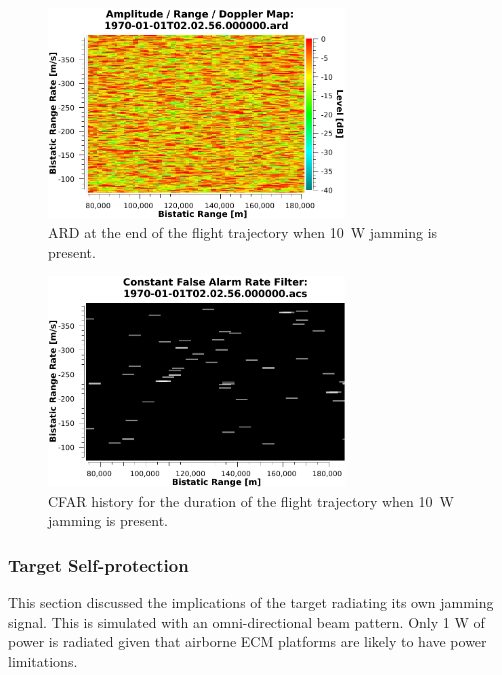 \documentclass[english, 12pt]{report}
\begin{document}
\begin{figure}[htbp]
\begin{center}
\includegraphics[width=0.7\textwidth]{figs/Simulations/10WJammingARDLast.pdf}
\caption{ARD at the end of the flight trajectory when 10~W jamming is present.}
\label{fig:10WJammingARDLast}
\end{center}
\end{figure}

\begin{figure}[htbp]
\begin{center}
\includegraphics[width=0.7\textwidth]{figs/Simulations/10WJammingCFAR.pdf}
\caption{CFAR history for the duration of the flight trajectory when 10~W jamming is present.}
\label{fig:10WJammingCFAR}
\end{center}
\end{figure}

\clearpage

\subsubsection{Target Self-protection}\label{sec:SelfProtection}

This section discussed the implications of the target radiating its own jamming signal. This is simulated with an omni-directional beam pattern. Only 1 W of power is radiated given that airborne ECM platforms are likely to have power limitations.
\end{document}
